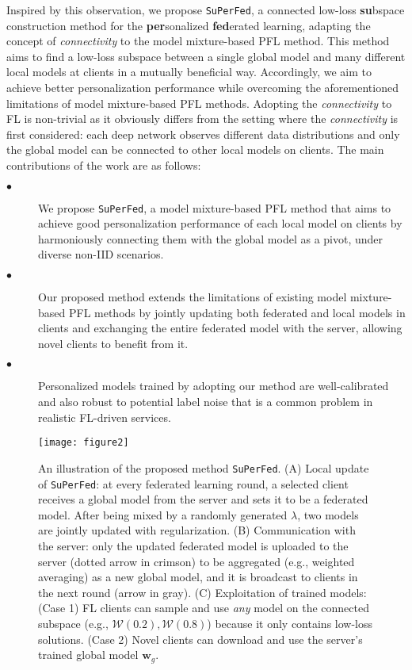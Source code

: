 \documentclass[sigconf]{acmart}
\begin{document}
\medskip
{}
Inspired by this observation, we propose \texttt{SuPerFed}, a connected low-loss \textbf{su}bspace construction method for the \textbf{per}sonalized \textbf{fed}erated learning, adapting the concept of \textit{connectivity} to the model mixture-based PFL method. This method aims to find a low-loss subspace between a single global model and many different local models at clients in a mutually beneficial way. Accordingly, we aim to achieve better personalization performance while overcoming the aforementioned limitations of model mixture-based PFL methods. Adopting the \textit{connectivity} to FL is non-trivial as it obviously differs from the setting where the \textit{connectivity} is first considered: each deep network observes different data distributions and only the global model can be connected to other local models on clients.
The main contributions of the work are as follows:
\begin{description}
\item[$\bullet$] We propose \texttt{SuPerFed}, a model mixture-based PFL method that aims to achieve good personalization performance of each local model on clients by harmoniously connecting them with the global model as a pivot, under diverse non-IID scenarios.
\item[$\bullet$] Our proposed method extends the limitations of existing model mixture-based PFL methods by jointly updating both federated and local models in clients and exchanging the entire federated model with the server, allowing novel clients to benefit from it.
\item[$\bullet$] Personalized models trained by adopting our method are well-calibrated and also robust to potential label noise that is a common problem in realistic FL-driven services.
\end{description}
\begin{figure*}[!htb]
\centering
\texttt{[image: figure2]}
\caption{An illustration of the proposed method \texttt{SuPerFed}. (A) Local update of \texttt{SuPerFed}: at every federated learning round, a selected client receives a global model from the server and sets it to be a federated model. After being mixed by a randomly generated $\lambda$, two models are jointly updated with regularization. (B) Communication with the server: only the updated federated model is uploaded to the server (dotted arrow in crimson) to be aggregated (e.g., weighted averaging) as a new global model, and it is broadcast to clients in the next round (arrow in gray). (C) Exploitation of trained models: (Case 1) FL clients can sample and use \textit{any} model on the connected subspace (e.g., $\mathcal{W}(0.2), \mathcal{W}(0.8)$) because it only contains low-loss solutions. (Case 2) Novel clients can download and use the server's trained global model $\mathbf{w}_g$.}\label{fig2}
\end{figure*}
\end{document}
